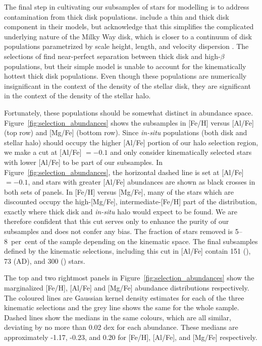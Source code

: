 The final step in cultivating our subsamples of \gse stars for modelling is to address contamination from thick disk populations. \cite{lane22} include a thin and thick disk component in their models, but acknowledge that this simplifies the complicated underlying nature of the Milky Way disk, which is closer to a continuum of disk populations parametrized by scale height, length, and velocity dispersion \parencite{bovy12}. The selections of \cite{lane22} find near-perfect separation between thick disk and high-$\beta$ populations, but their simple model is unable to account for the kinematically hottest thick disk populations. Even though these populations are numerically insignificant in the context of the density of the stellar disk, they are significant in the context of the density of the stellar halo.

Fortunately, these populations should be somewhat distinct in abundance space. Figure~\ref{fig:selection_abundances} shows the \gse subsamples in [Fe/H] versus [Al/Fe] (top row) and [Mg/Fe] (bottom row). Since \textit{in-situ} populations (both disk and stellar halo) should occupy the higher [Al/Fe] portion of our halo selection region, we make a cut at [Al/Fe] $= -0.1$ and only consider kinematically selected stars with lower [Al/Fe] to be part of our \gse subsamples. In Figure~\ref{fig:selection_abundances}, the horizontal dashed line is set at [Al/Fe] $= -0.1$, and stars with greater [Al/Fe] abundances are shown as black crosses in both sets of panels. In [Fe/H] versus [Mg/Fe], many of the stars which are discounted occupy the high-[Mg/Fe], intermediate-[Fe/H] part of the distribution, exactly where thick disk and \textit{in-situ} halo would expect to be found. We are therefore confident that this cut serves only to enhance the purity of our \gse subsamples and does not confer any bias. The fraction of stars removed is 5--8~per~cent of the sample depending on the kinematic space. The final \gse subsamples defined by the kinematic selections, including this cut in [Al/Fe] contain 151 (\eLz), 73 (AD), and 300 (\JRLz) stars.

The top and two rightmost panels in Figure~\ref{fig:selection_abundances} show the marginalized [Fe/H], [Al/Fe] and [Mg/Fe] abundance distributions respectively. The coloured lines are Gaussian kernel density estimates for each of the three kinematic selections and the grey line shows the same for the whole sample. Dashed lines show the medians in the same colours, which are all similar, deviating by no more than 0.02 dex for each abundance. These medians are approximately -1.17, -0.23, and 0.20 for [Fe/H], [Al/Fe], and [Mg/Fe] respectively.

